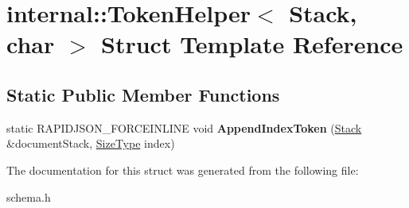 \hypertarget{a02400}{}\section{internal\+:\+:Token\+Helper$<$ Stack, char $>$ Struct Template Reference}
\label{a02400}
\subsection*{Static Public Member Functions}
\begin{DoxyCompactItemize}
\item 
\mbox{\label{a02400_a5d635eb7590e098c3340c9e5dcc72ae3}} 
static R\+A\+P\+I\+D\+J\+S\+O\+N\+\_\+\+F\+O\+R\+C\+E\+I\+N\+L\+I\+NE void {\bfseries Append\+Index\+Token} (\hyperlink{a02288}{Stack} \&document\+Stack, \hyperlink{a00560_a5ed6e6e67250fadbd041127e6386dcb5}{Size\+Type} index)
\end{DoxyCompactItemize}


The documentation for this struct was generated from the following file\+:\begin{DoxyCompactItemize}
\item 
schema.\+h\end{DoxyCompactItemize}
